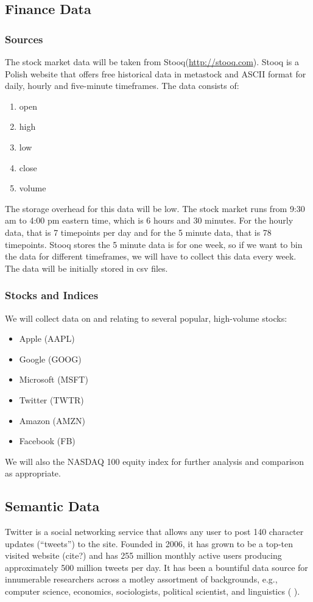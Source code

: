 \documentclass[titlepage]{article}\usepackage[]{graphicx}\usepackage[]{color}
\begin{document}
\subsection{Finance Data}
\subsubsection{Sources}
The stock market data will be taken from Stooq(\url{http://stooq.com}). Stooq
is a Polish website that offers free historical data in metastock and ASCII
format for daily, hourly and five-minute timeframes. The data consists of:
\begin{enumerate}
\item open
\item high
\item low
\item close
\item volume
\end{enumerate}

The storage overhead for this data will be low. The stock market runs from 9:30
am to 4:00 pm eastern time, which is 6 hours and 30 minutes. For the hourly
data, that is 7 timepoints per day and for the 5 minute data, that is 78
timepoints. Stooq stores the 5 minute data is for one week, so if we want to bin
the data for different timeframes, we will have to collect this data every
week. The data will be initially stored in csv files.

\subsubsection{Stocks and Indices}
We will collect data on and relating to several popular, high-volume stocks:

\begin{itemize}
	\item Apple (AAPL)
	\item Google (GOOG)
	\item Microsoft (MSFT)
	\item Twitter (TWTR)
	\item Amazon (AMZN)
	\item Facebook (FB)
\end{itemize}

We will also the NASDAQ 100 equity index for further analysis and
comparison as appropriate.


\subsection{Semantic Data}
Twitter is a social networking service that allows any user to post 140
character updates (``tweets'') to the site. Founded in 2006, it has grown to be
a top-ten visited website (cite?) and has 255 million monthly active users
producing approximately 500 million tweets per day. It has been a bountiful
data source for innumerable researchers across a motley assortment of
backgrounds, e.g., computer science, economics, sociologists, political
scientist, and linguistics (\cite{twitterIPO, twitterInvestorReport} ).
\end{document}
